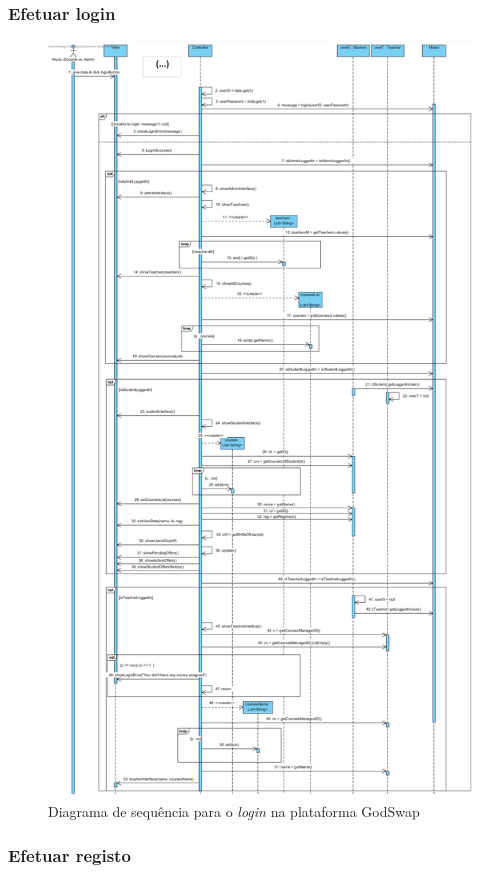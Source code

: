 \documentclass[a4paper]{article}
\begin{document}
\subsubsection{Efetuar login}

\begin{figure}[H]
\centering
\includegraphics[height=20cm]{SEQEfetuarLogin}
\caption{Diagrama de sequência para o \emph{login} na plataforma GodSwap}
\label{}
\end{figure}

\subsubsection{Efetuar registo}
\end{document}
